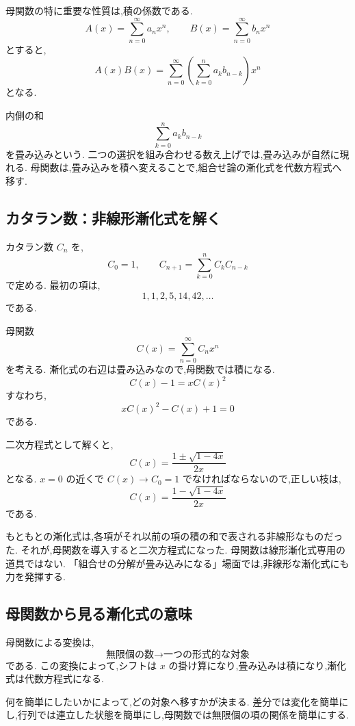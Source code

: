 母関数の特に重要な性質は,積の係数である.
\[
  A(x)=\sum_{n=0}^{\infty}a_nx^n,\qquad
  B(x)=\sum_{n=0}^{\infty}b_nx^n
\]
とすると,
\[
  A(x)B(x)
  =
  \sum_{n=0}^{\infty}
  \left(\sum_{k=0}^{n}a_kb_{n-k}\right)x^n
\]
となる.

内側の和
\[
  \sum_{k=0}^{n}a_kb_{n-k}
\]
を畳み込みという.
二つの選択を組み合わせる数え上げでは,畳み込みが自然に現れる.
母関数は,畳み込みを積へ変えることで,組合せ論の漸化式を代数方程式へ移す.

\subsection{カタラン数：非線形漸化式を解く}

カタラン数 $C_n$ を,
\[
  C_0=1,\qquad
  C_{n+1}=\sum_{k=0}^{n}C_kC_{n-k}
\]
で定める.
最初の項は,
\[
  1,1,2,5,14,42,\ldots
\]
である.

母関数
\[
  C(x)=\sum_{n=0}^{\infty}C_nx^n
\]
を考える.
漸化式の右辺は畳み込みなので,母関数では積になる.
\[
  C(x)-1=xC(x)^2
\]
すなわち,
\[
  xC(x)^2-C(x)+1=0
\]
である.

二次方程式として解くと,
\[
  C(x)=\frac{1\pm\sqrt{1-4x}}{2x}
\]
となる.
$x=0$ の近くで $C(x)\to C_0=1$ でなければならないので,正しい枝は,
\[
  C(x)=\frac{1-\sqrt{1-4x}}{2x}
\]
である.

もともとの漸化式は,各項がそれ以前の項の積の和で表される非線形なものだった.
それが,母関数を導入すると二次方程式になった.
母関数は線形漸化式専用の道具ではない.
「組合せの分解が畳み込みになる」場面では,非線形な漸化式にも力を発揮する.

\subsection{母関数から見る漸化式の意味}

母関数による変換は,
\[
  \text{無限個の数}
  \longrightarrow
  \text{一つの形式的な対象}
\]
である.
この変換によって,シフトは $x$ の掛け算になり,畳み込みは積になり,漸化式は代数方程式になる.

何を簡単にしたいかによって,どの対象へ移すかが決まる.
差分では変化を簡単にし,行列では連立した状態を簡単にし,母関数では無限個の項の関係を簡単にする.

